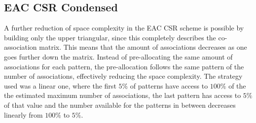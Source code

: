 
\subsection{EAC CSR Condensed}

A further reduction of space complexity in the EAC CSR scheme is possible by building only the upper triangular, since this completely describes the co-association matrix.
This means that the amount of associations decreases as one goes further down the matrix.
Instead of pre-allocating the same amount of associations for each pattern, the pre-allocation follows the same pattern of the number of associations, effectively reducing the space complexity.
The strategy used was a linear one, where the first $5\%$ of patterns have access to $100\%$ of the the estimated maximum number of associations, the last pattern has access to $5\%$ of that value and the number available for the patterns in between decreases linearly from $100\%$ to $5\%$.